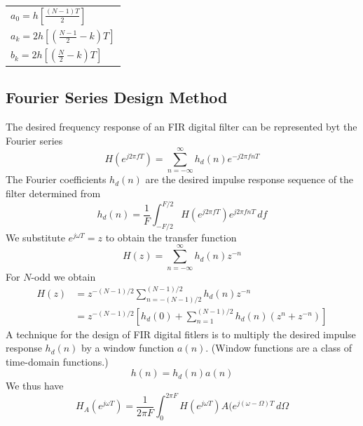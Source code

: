 \documentclass[11pt]{book}
\theoremstyle{example}
\begin{document}
\begin{center}
	\begin{tabular}{|l|}
		\hline
		$a_0=h\left[\frac{(N-1)T}{2}\right]$\\
		$a_k=2h\left[\left(\frac{N-1}{2}-k\right)T\right]$\\
		$b_k=2h\left[\left(\frac{N}{2}-k\right)T\right]$\\
		\hline
	\end{tabular}
\end{center}

\subsection{Fourier Series Design Method}

The desired frequency response of an FIR digital filter can be represented byt the Fourier series
\begin{equation}
	H(e^{j2{\pi}fT})=\sum_{n=-\infty}^\infty{h_d(n)e^{-j2{\pi}fnT}}
\end{equation}
The Fourier coefficients $h_d(n)$ are the desired impulse response sequence of the filter determined from
\begin{equation}
	h_d(n)=\frac{1}{F}\int_{-F/2}^{F/2}{H(e^{j2{\pi}fT})e^{j2{\pi}fnT}\,df}
\end{equation}
We substitute $e^{j{\omega}T}=z$ to obtain the transfer function
\begin{equation}
	H(z)=\sum_{n=-\infty}^\infty{h_d(n)z^{-n}}
\end{equation}
For $N$-odd we obtain
\begin{equation}
	\begin{split}
		H(z)&=z^{-(N-1)/2}\sum_{n=-(N-1)/2}^{(N-1)/2}{h_d(n)z^{-n}}\\
		&=z^{-(N-1)/2}\left[h_d(0)+\sum_{n=1}^{(N-1)/2}{h_d(n)(z^n+z^{-n})}\right]
	\end{split}
\end{equation}
A technique for the design of FIR digital fitlers is to multiply the desired impulse response $h_d(n)$ by a window function $a(n)$. (Window functions are a class of time-domain functions.)
\begin{equation}
	h(n)=h_d(n)a(n)
\end{equation}
We thus have
\begin{equation}
	H_A(e^{j{\omega}T})=\frac{1}{2{\pi}F}\int_{0}^{2{\pi}F}{H(e^{j{\omega}T})A(e^{j(\omega-\Omega)T}\,d\Omega}
\end{equation}
\end{document}
